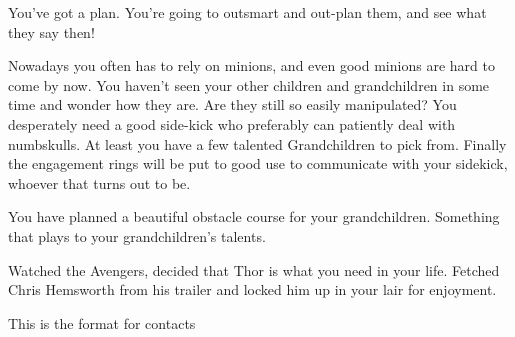 \documentclass[char]{LRSguildcamp1}
\begin{document}
You've got a plan. You're  going to outsmart and out-plan them, and see what they say then! 

Nowadays you often has to rely on minions, and even good minions are hard to come by now. You haven't seen your other children and grandchildren in some time and wonder how they are. Are they still so easily manipulated? You desperately need a good side-kick who preferably can patiently deal with numbskulls.  At least you have a few talented Grandchildren to pick from. Finally the engagement rings will be put to good use to communicate with your sidekick, whoever that turns out to be. 

You have planned a beautiful obstacle course for your grandchildren. Something that plays to your grandchildren’s talents. 

Watched the Avengers, decided that Thor is what you need in your life. Fetched Chris Hemsworth from his trailer and locked him up in your lair for enjoyment.

\begin{itemz}[Goals]
	\item 
\end{itemz}

\begin{itemz}[Notes]
	\item 
\end{itemz}

\begin{contacts}
	\contact{} This is the format for contacts 
\end{contacts}
\end{document}
